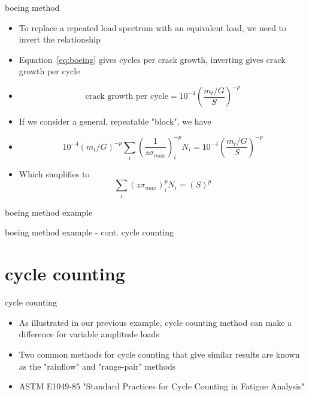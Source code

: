\documentclass[10pt]{beamer}
\begin{document}
\begin{frame}{boeing method}
	\begin{itemize}[<+->]
		\item To replace a repeated load spectrum with an equivalent load, we need to invert the relationship
		\item Equation~\ref{eq:boeing} gives cycles per crack growth, inverting gives crack growth per cycle
		\item[] \begin{equation}
		\text{crack growth per cycle} = 10^{-4} \left(\frac{m_t/G}{S}\right)^{-p}
		\end{equation}
		\item If we consider a general, repeatable "block", we have
		\item[] \begin{equation}
		10^{-4} \left( m_t/G \right)^{-p} \sum_i \left( \frac{1}{z\sigma_{max}} \right)_i^{-p} N_i = 10^{-4} \left( \frac{m_t/G}{S} \right)^{-p}
		\end{equation}
		\item Which simplifies to
		\begin{equation}
		\sum_i \left( z\sigma_{max} \right)_i^{p}N_i = \left( S \right)^{p}
		\end{equation}		
	\end{itemize}
\end{frame}

\begin{frame}{boeing method example}
\end{frame}

\begin{frame}{boeing method example - cont.}
	cycle counting
\end{frame}

\section{cycle counting}

\begin{frame}{cycle counting}
	\begin{itemize}[<+->]
		\item As illustrated in our previous example, cycle counting method can make a difference for variable amplitude loads
		\item Two common methods for cycle counting that give similar results are known as the "rainflow" and "range-pair" methods
		\item ASTM E1049-85 "Standard Practices for Cycle Counting in Fatigue Analysis"
	\end{itemize}
\end{frame}
\end{document}
